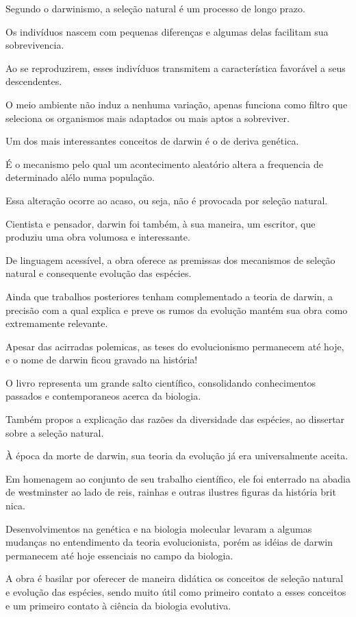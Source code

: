 \documentclass[12pt]{extarticle}
\begin{document}
Segundo o darwinismo, a seleção natural é um processo de longo prazo.


Os indivíduos nascem com pequenas diferenças e algumas delas facilitam sua sobrevivencia.


Ao se reproduzirem, esses indivíduos transmitem a característica favorável a seus descendentes.


O meio ambiente não induz a nenhuma variação, apenas funciona como filtro que seleciona os organismos mais adaptados ou mais aptos a sobreviver.


Um dos mais interessantes conceitos de darwin é o de deriva genética. 

É o mecanismo pelo qual um acontecimento aleatório altera a frequencia de determinado alélo numa população.


Essa alteração ocorre ao acaso, ou seja, não é provocada por seleção natural.


Cientista e pensador, darwin foi também, à sua maneira, um escritor, que produziu uma obra volumosa e interessante.


De linguagem acessível, a obra oferece as premissas dos mecanismos de seleção natural e consequente evolução das espécies.

Ainda que trabalhos posteriores tenham complementado a teoria de darwin, a precisão com a qual explica e preve os rumos da evolução mantém sua obra como extremamente relevante.


Apesar das acirradas polemicas, as teses do evolucionismo permanecem até hoje,   e o nome de darwin ficou gravado na história!


O livro representa um grande salto científico,
consolidando conhecimentos passados e contemporaneos acerca da biologia.

Também propos a explicação das razões da diversidade das espécies,    ao dissertar sobre a seleção natural.

À época da morte de darwin, sua teoria da evolução já era universalmente aceita. 

Em homenagem ao conjunto de seu trabalho científico, ele foi enterrado na abadia de westminster ao lado de reis, rainhas e outras ilustres figuras da história brit nica. 

Desenvolvimentos na genética e na biologia molecular levaram a algumas mudanças no entendimento da teoria evolucionista, porém as idéias de darwin permanecem até hoje essenciais no campo da biologia.

A obra é basilar por oferecer de maneira didática os conceitos de seleção natural e evolução das espécies, sendo muito útil como primeiro contato a esses conceitos e um primeiro contato à ciência da biologia evolutiva.
\end{document}
